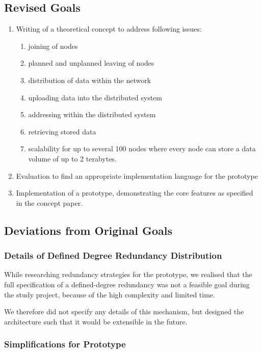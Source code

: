 \subsection{Revised Goals}
\begin{enumerate}
    \item Writing of a theoretical concept to address following issues:
        \begin{enumerate}
            \item joining of nodes
            \item planned and unplanned leaving of nodes
            \item distribution of data within the network
            \item uploading data into the distributed system
            \item addressing within the distributed system
            \item retrieving stored data
            \item scalability for up to several 100 nodes where every node can store a data volume of up to 2 terabytes.
        \end{enumerate}
    \item Evaluation to find an appropriate implementation language for the prototype
    \item Implementation of a prototype, demonstrating the core features as specified in the concept paper.
\end{enumerate}

\subsection{Deviations from Original Goals}

\subsubsection{Details of Defined Degree Redundancy Distribution}

While researching redundancy strategies for the prototype, we realised that the full specification of a defined-degree redundancy was not a feasible goal during the study project, because of the high complexity and limited time.

We therefore did not specify any details of this mechanism, but designed the architecture such that it would be extensible in the future.

\subsubsection{Simplifications for Prototype}

